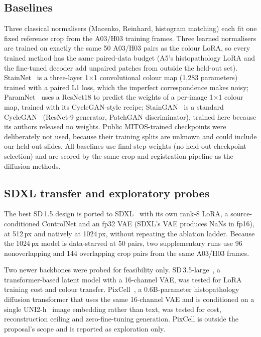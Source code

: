 \subsection{Baselines}
\label{sec:baselines}
Three classical normalisers (Macenko, Reinhard, histogram matching) each fit one fixed reference crop from
the A03/H03 training frames. Three learned normalisers are trained on exactly the same 50 A03/H03 pairs as the
colour LoRA, so every trained method has the same paired-data budget (A5's histopathology LoRA and the fine-tuned
decoder add unpaired patches from outside the held-out set). StainNet~\cite{kang2021stainnet} is a three-layer 1$\times$1 convolutional
colour map (1{,}283 parameters) trained with a paired L1 loss, which the imperfect correspondence makes noisy; ParamNet~\cite{kang2024paramnet} uses a
ResNet18 to predict the weights of a per-image 1$\times$1 colour map, trained with its CycleGAN-style recipe;
StainGAN~\cite{shaban2019staingan} is a standard CycleGAN~\cite{zhu2017cyclegan} (ResNet-9 generator,
PatchGAN discriminator), trained here because its authors released no weights. Public MITOS-trained
checkpoints were deliberately not used, because their training splits are unknown and could include our
held-out slides. All baselines use final-step weights (no held-out checkpoint selection) and are scored by
the same crop and registration pipeline as the diffusion methods.

\subsection{SDXL transfer and exploratory probes}
The best SD\,1.5 design is ported to SDXL~\cite{podell2023sdxl} with its own rank-8 LoRA, a
source-conditioned ControlNet and an fp32 VAE (SDXL's VAE produces NaNs in fp16), at 512\,px and natively at
1024\,px, without repeating the ablation ladder. Because the 1024\,px model is data-starved at 50 pairs, two
supplementary runs use 96 nonoverlapping and 144 overlapping crop pairs from the same A03/H03 frames.

Two newer backbones were probed for feasibility only. SD\,3.5-large~\cite{esser2024sd3}, a transformer-based latent model with a
16-channel VAE, was tested for LoRA training cost and colour transfer. PixCell~\cite{yellapragada2025pixcell}, a 0.6B-parameter
histopathology diffusion transformer that uses the same 16-channel VAE and is conditioned on a single UNI2-h~\cite{chen2024uni}
image embedding rather than text, was tested for cost, reconstruction ceiling and zero-fine-tuning
generation. PixCell is outside the proposal's scope and is reported as exploration only.
